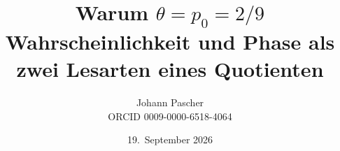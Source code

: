 \documentclass[11pt,a4paper]{report}
\title{Warum $\theta = p_0 = 2/9$\\[0.5em]\large Wahrscheinlichkeit und Phase als zwei Lesarten eines Quotienten}
\date{19.~September 2026}
\author{Johann Pascher\\\small ORCID 0009-0000-6518-4064}
\begin{document}
\renewcommand{\thechapter}{}
\renewcommand{\thesection}{\arabic{section}}
\maketitle
\tableofcontents

\end{document}
